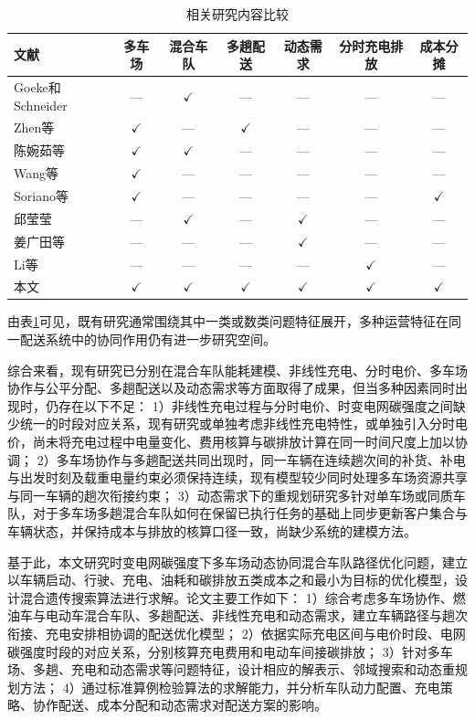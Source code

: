 \documentclass{setp-new}
\newcommand{\setptabsetup}{\small\renewcommand{\arraystretch}{0.95}\setlength{\tabcolsep}{2.2pt}\hbadness=10000}
\begin{document}
\begin{table}[H]
\centering
\caption{相关研究内容比较}
\label{tab:literature-comparison}
\setptabsetup
\begin{tabular*}{\linewidth}{@{\extracolsep{\fill}}lcccccc@{}}
\toprule
文献 & 多车场 & 混合车队 & 多趟配送 & 动态需求 & 分时充电排放 & 成本分摊\\
\midrule
Goeke和Schneider\cite{ref:27} & --- & $\checkmark$ & --- & --- & --- & ---\\
Zhen等\cite{ref:44} & $\checkmark$ & --- & $\checkmark$ & --- & --- & ---\\
陈婉茹等\cite{ref:23} & $\checkmark$ & $\checkmark$ & --- & --- & --- & ---\\
Wang等\cite{ref:7} & $\checkmark$ & --- & --- & --- & --- & ---\\
Soriano等\cite{ref:8} & $\checkmark$ & --- & --- & --- & --- & $\checkmark$\\
邱莹莹\cite{ref:71} & --- & $\checkmark$ & --- & $\checkmark$ & --- & ---\\
姜广田等\cite{ref:51} & --- & --- & --- & $\checkmark$ & --- & ---\\
Li等\cite{ref:52} & --- & --- & --- & --- & $\checkmark$ & ---\\
本文 & $\checkmark$ & $\checkmark$ & $\checkmark$ & $\checkmark$ & $\checkmark$ & $\checkmark$\\
\bottomrule
\end{tabular*}
\end{table}

由表\ref{tab:literature-comparison}可见，既有研究通常围绕其中一类或数类问题特征展开，多种运营特征在同一配送系统中的协同作用仍有进一步研究空间。

综合来看，现有研究已分别在混合车队能耗建模、非线性充电、分时电价、多车场协作与公平分配、多趟配送以及动态需求等方面取得了成果，但当多种因素同时出现时，仍存在以下不足：
1）非线性充电过程与分时电价、时变电网碳强度之间缺少统一的时段对应关系，现有研究或单独考虑非线性充电特性，或单独引入分时电价，尚未将充电过程中电量变化、费用核算与碳排放计算在同一时间尺度上加以协调；
2）多车场协作与多趟配送共同出现时，同一车辆在连续趟次间的补货、补电与出发时刻及载重电量约束必须保持连续，现有模型较少同时处理多车场资源共享与同一车辆的趟次衔接约束；
3）动态需求下的重规划研究多针对单车场或同质车队，对于多车场多趟混合车队如何在保留已执行任务的基础上同步更新客户集合与车辆状态，并保持成本与排放的核算口径一致，尚缺少系统的建模方法。

基于此，本文研究时变电网碳强度下多车场动态协同混合车队路径优化问题，建立以车辆启动、行驶、充电、油耗和碳排放五类成本之和最小为目标的优化模型，设计混合遗传搜索算法进行求解。论文主要工作如下：
1）综合考虑多车场协作、燃油车与电动车混合车队、多趟配送、非线性充电和动态需求，建立车辆路径与趟次衔接、充电安排相协调的配送优化模型；
2）依据实际充电区间与电价时段、电网碳强度时段的对应关系，分别核算充电费用和电动车间接碳排放；
3）针对多车场、多趟、充电和动态需求等问题特征，设计相应的解表示、邻域搜索和动态重规划方法；
4）通过标准算例检验算法的求解能力，并分析车队动力配置、充电策略、协作配送、成本分配和动态需求对配送方案的影响。
\end{document}

